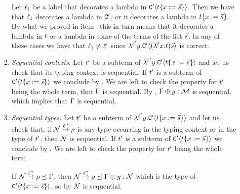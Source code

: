 \begin{enumerate}
\begin{enumerate}
      Let $\ell_1$ be a label that decorates a lambda in $\mathtt{C}'\langle t\{x := \vec{s}\}\rangle$.
      Then we have that $\ell_1$ decorates a lambda in $\mathtt{C}'$,
      or it decorates a lambda in $t\{x := \vec{s}\}$.
      By what we proved in item~
      this in turn means that it decorates a lambda in $t$ or a lambda in some of the terms of the list $\vec{s}$.
      In any of these cases we have that $\ell_1 \neq \ell'$
      since $\lambda^{\ell'} y. \mathtt{C}'\langle(\lambda^{\ell} x. t)\vec{s}\rangle$ is correct.
    \item {\em Sequential contexts.}
      Let $t'$ be a subterm of $\lambda^{\ell'} y. \mathtt{C}'\langle t\{x := \vec{s}\}\rangle$
      and let us check that its typing context is sequential.
      If $t'$ is a subterm of $\mathtt{C}'\langle t\{x := \vec{s}\}\rangle$ we conclude by \ih.
      We are left to check the property for $t'$ being the whole term, \ie that $\Gamma$ is sequential.
      By \ih, $\Gamma \oplus y : \mathcal{M}$ is sequential, which implies that $\Gamma$ is sequential.
    \item {\em Sequential types.}
      Let $t'$ be a subterm of $\lambda^{\ell'} y. \mathtt{C}'\langle t\{x := \vec{s}\}\rangle$
      and let us check that, if $\mathcal{N} \overset{\ell''}{\to} \rho$ is any type occurring in the typing
      context or in the type of $t'$, then $\mathcal{N}$ is sequential.
      If $t'$ is a subterm of $\mathtt{C}'\langle t\{x := \vec{s}\}\rangle$ we conclude by \ih.
      We are left to check the property for $t'$ being the whole term.

      If $\mathcal{N} \overset{\ell''}{\to} \rho \preceq \Gamma$,
      then $\mathcal{N} \overset{\ell''}{\to} \rho \preceq \Gamma \oplus y:\mathcal{N}$
      which is the type of $\mathtt{C}'\langle t\{x := \vec{s}\}\rangle$,
      so by \ih $\mathcal{N}$ is sequential.


\end{enumerate}
\end{enumerate}
